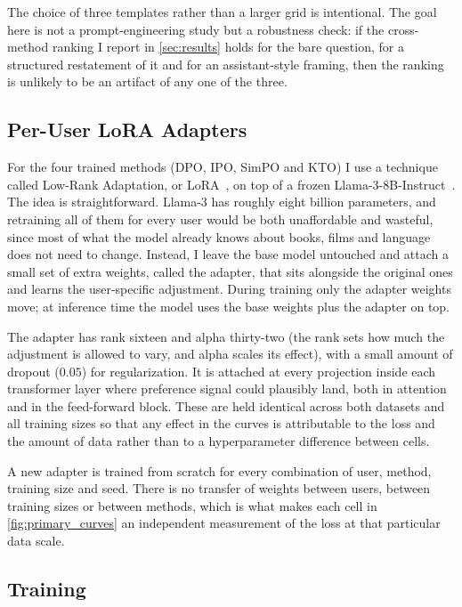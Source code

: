 The choice of three templates rather than a larger grid is intentional. The goal here is not a prompt-engineering study but a robustness check: if the cross-method ranking I report in \cref{sec:results} holds for the bare question, for a structured restatement of it and for an assistant-style framing, then the ranking is unlikely to be an artifact of any one of the three.


\subsection{Per-User LoRA Adapters}
\label{sec:lora}

For the four trained methods (DPO, IPO, SimPO and KTO) I use a technique called Low-Rank Adaptation, or LoRA~\citep{hu2021lora}, on top of a frozen Llama-3-8B-Instruct~\citep{llama3}. The idea is straightforward. Llama-3 has roughly eight billion parameters, and retraining all of them for every user would be both unaffordable and wasteful, since most of what the model already knows about books, films and language does not need to change. Instead, I leave the base model untouched and attach a small set of extra weights, called the adapter, that sits alongside the original ones and learns the user-specific adjustment. During training only the adapter weights move; at inference time the model uses the base weights plus the adapter on top.

The adapter has rank sixteen and alpha thirty-two (the rank sets how much the adjustment is allowed to vary, and alpha scales its effect), with a small amount of dropout ($0.05$) for regularization. It is attached at every projection inside each transformer layer where preference signal could plausibly land, both in attention and in the feed-forward block. These are held identical across both datasets and all training sizes so that any effect in the curves is attributable to the loss and the amount of data rather than to a hyperparameter difference between cells.

A new adapter is trained from scratch for every combination of user, method, training size and seed. There is no transfer of weights between users, between training sizes or between methods, which is what makes each cell in \cref{fig:primary_curves} an independent measurement of the loss at that particular data scale.

\subsection{Training}
\label{sec:training}

